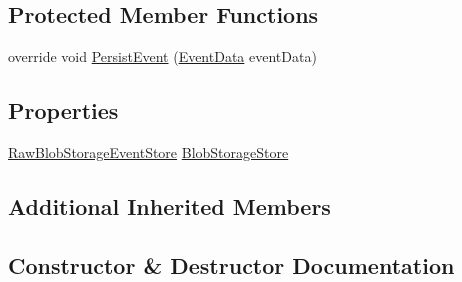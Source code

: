 \subsection*{Protected Member Functions}
\begin{DoxyCompactItemize}
\item 
override void \hyperlink{classCqrs_1_1Azure_1_1BlobStorage_1_1Events_1_1BlobStorageEventStore_aa27a352076b8967498407d24814f7c83_aa27a352076b8967498407d24814f7c83}{Persist\+Event} (\hyperlink{classCqrs_1_1Events_1_1EventData}{Event\+Data} event\+Data)
\end{DoxyCompactItemize}
\subsection*{Properties}
\begin{DoxyCompactItemize}
\item 
\hyperlink{classCqrs_1_1Azure_1_1BlobStorage_1_1Events_1_1BlobStorageEventStore_1_1RawBlobStorageEventStore}{Raw\+Blob\+Storage\+Event\+Store} \hyperlink{classCqrs_1_1Azure_1_1BlobStorage_1_1Events_1_1BlobStorageEventStore_a85b9d71c130e5748886a61d80447116d_a85b9d71c130e5748886a61d80447116d}{Blob\+Storage\+Store}
\end{DoxyCompactItemize}
\subsection*{Additional Inherited Members}


\subsection{Constructor \& Destructor Documentation}
\mbox{\label{classCqrs_1_1Azure_1_1BlobStorage_1_1Events_1_1BlobStorageEventStore_a04ce4516e7e1d30339d3f04ba54abe54_a04ce4516e7e1d30339d3f04ba54abe54}} 
